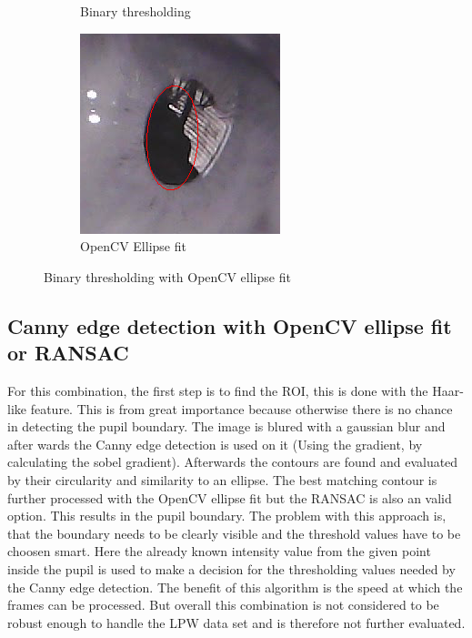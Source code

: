 \begin{figure}[h]
\begin{subfigure}{0.3\textwidth}
        \caption{Binary thresholding}
    \end{subfigure}%
    \hfill
    \begin{subfigure}{0.3\textwidth}
        \centering
        \includegraphics[width=0.9\linewidth]{plots/results/roi_result_binary_ellipse.png}
        \caption{OpenCV Ellipse fit}
    \end{subfigure}%
    \caption{Binary thresholding with OpenCV ellipse fit}
    \label{fig:binary_threshold_ellipse_fit}
\end{figure}

\subsection{Canny edge detection with OpenCV ellipse fit or RANSAC}
For this combination, the first step is to find the ROI, this is done with the Haar-like feature. This is from great importance because otherwise there is no chance in detecting the pupil boundary. The image is blured with a gaussian blur and after wards the Canny edge detection is used on it (Using the gradient, by calculating the sobel gradient). Afterwards the contours are found and evaluated by their circularity and similarity to an ellipse. The best matching contour is further processed with the OpenCV ellipse fit but the RANSAC is also an valid option. This results in the pupil boundary. The problem with this approach is, that the boundary needs to be clearly visible and the threshold values have to be choosen smart. Here the already known intensity value from the given point inside the pupil is used to make a decision for the thresholding values needed by the Canny edge detection. The benefit of this algorithm is the speed at which the frames can be processed. But overall this combination is not considered to be robust enough to handle the LPW data set and is therefore not further evaluated.

